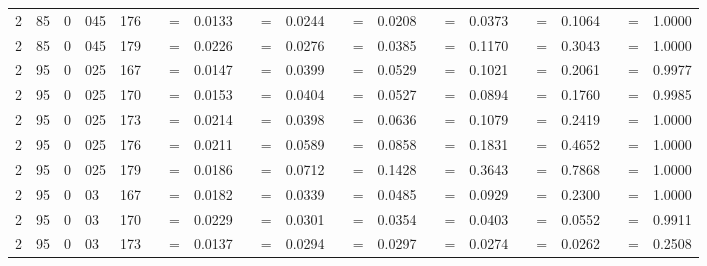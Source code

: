 \begin{tabular*}{260mm}{r@{.}lr@{.}lc|ccc:ccc:ccc:ccc:ccc|ccc}
		2&85	&	0&045	&	176	&	 &=& 0.0133 & 	 &=& 0.0244 & 	 &=& 0.0208 & 	 &=& 0.0373 & 	 &=& 0.1064 & 	 &=& 1.0000 \\ 
		2&85	&	0&045	&	179	&	 &=& 0.0226 & 	 &=& 0.0276 & 	 &=& 0.0385 & 	 &=& 0.1170 & 	 &=& 0.3043 & 	 &=& 1.0000 \\ 
		2&95	&	0&025	&	167	&	 &=& 0.0147 & 	 &=& 0.0399 & 	 &=& 0.0529 & 	 &=& 0.1021 & 	 &=& 0.2061 & 	 &=& 0.9977 \\ 
		2&95	&	0&025	&	170	&	 &=& 0.0153 & 	 &=& 0.0404 & 	 &=& 0.0527 & 	 &=& 0.0894 & 	 &=& 0.1760 & 	 &=& 0.9985 \\ 
		2&95	&	0&025	&	173	&	 &=& 0.0214 & 	 &=& 0.0398 & 	 &=& 0.0636 & 	 &=& 0.1079 & 	 &=& 0.2419 & 	 &=& 1.0000 \\ 
		2&95	&	0&025	&	176	&	 &=& 0.0211 & 	 &=& 0.0589 & 	 &=& 0.0858 & 	 &=& 0.1831 & 	 &=& 0.4652 & 	 &=& 1.0000 \\ 
		2&95	&	0&025	&	179	&	 &=& 0.0186 & 	 &=& 0.0712 & 	 &=& 0.1428 & 	 &=& 0.3643 & 	 &=& 0.7868 & 	 &=& 1.0000 \\ 
		2&95	&	0&03	&	167	&	 &=& 0.0182 & 	 &=& 0.0339 & 	 &=& 0.0485 & 	 &=& 0.0929 & 	 &=& 0.2300 & 	 &=& 1.0000 \\ 
		2&95	&	0&03	&	170	&	 &=& 0.0229 & 	 &=& 0.0301 & 	 &=& 0.0354 & 	 &=& 0.0403 & 	 &=& 0.0552 & 	 &=& 0.9911 \\ 
		2&95	&	0&03	&	173	&	 &=& 0.0137 & 	 &=& 0.0294 & 	 &=& 0.0297 & 	 &=& 0.0274 & 	 &=& 0.0262 & 	 &=& 0.2508 \\ 

\end{tabular*}
